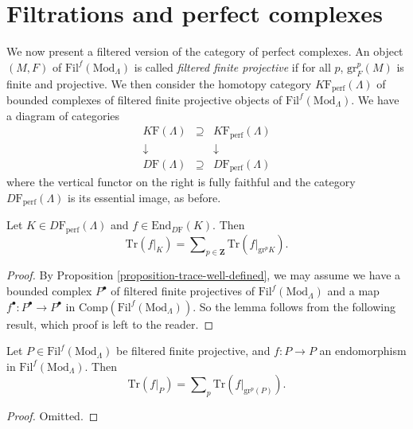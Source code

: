 \section{Filtrations and perfect complexes}
\label{section-filtrations-perfect}

\noindent
We now present a filtered version of the category of perfect complexes. An
object $(M, F)$ of $\text{Fil}^f(\text{Mod}_\Lambda)$ is called {\it filtered
finite projective} if for all $p$, $\text{gr}^p_F (M)$ is finite and
projective. We then consider the homotopy category
$K\mathrm{F}_{\text{perf}}(\Lambda)$ of bounded complexes of filtered finite
projective objects of $\text{Fil}^f(\text{Mod}_\Lambda)$. We have a diagram of
categories
$$
\begin{matrix}
K\mathrm{F}(\Lambda) & \supseteq & K\mathrm{F}_{\text{perf}}(\Lambda)\\
\downarrow & & \downarrow\\
D\mathrm{F}(\Lambda) & \supseteq & D\mathrm{F}_{\text{perf}}(\Lambda)
\end{matrix}
$$
where the vertical functor on the right is fully faithful and the category
$D\mathrm{F}_{\text{perf}}(\Lambda)$ is its essential image, as before.

\begin{lemma}[Additivity]
\label{lemma-additivity}
Let $K\in D\mathrm{F}_{\text{perf}}(\Lambda)$ and $f\in
\text{End}_{D\mathrm{F}}(K)$. Then
$$
\text{Tr}(f|_K) =
\sum\nolimits_{p\in \mathbf{Z}} \text{Tr}(f|_{\text{gr}^p K}).
$$
\end{lemma}

\begin{proof}
By Proposition \ref{proposition-trace-well-defined}, we may assume we have
a bounded
complex $P^\bullet$ of filtered finite projectives of
$\text{Fil}^f(\text{Mod}_\Lambda)$ and a map $f^\bullet: P^\bullet\to
P^\bullet$ in $\text{Comp}(\text{Fil}^f(\text{Mod}_\Lambda))$. So the lemma
follows from the following result, which proof is left to the reader.
\end{proof}

\begin{lemma}
\label{lemma-additive-filtered-finite-projective}
Let $P \in \text{Fil}^f(\text{Mod}_\Lambda)$ be filtered finite projective, and
$f: P \to P$ an endomorphism in $\text{Fil}^f(\text{Mod}_\Lambda)$. Then
$$
\text{Tr}(f|_P) =
\sum\nolimits_p \text{Tr}(f|_{\text{gr}^p(P)}).
$$
\end{lemma}

\begin{proof}
Omitted.
\end{proof}








